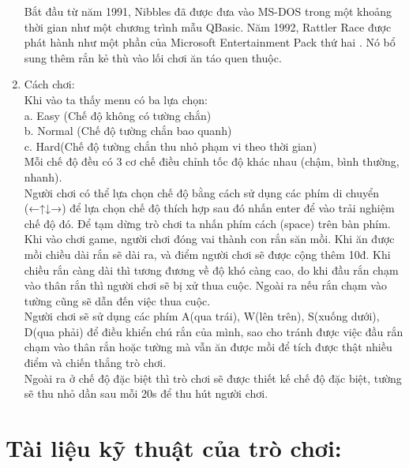 \documentclass{article}
\begin{document}
\begin{enumerate}
    Bắt đầu từ năm 1991, Nibbles đã được đưa vào MS-DOS trong một khoảng thời gian như một chương trình mẫu QBasic. Năm 1992, Rattler Race được phát hành như một phần của Microsoft Entertainment Pack thứ hai . Nó bổ sung thêm rắn kẻ thù vào lối chơi ăn táo quen thuộc.
    \item Cách chơi:\\
    Khi vào ta thấy menu có ba lựa chọn:\\
     a. Easy (Chế độ không có tường chắn)\\
     b. Normal (Chế độ tường chắn bao quanh)\\
     c. Hard(Chế độ tường chắn thu nhỏ phạm vi theo thời gian)\\
     Mỗi chế độ đều có 3 cơ chế điều chỉnh tốc độ khác nhau (chậm, bình thường, nhanh).\\
     Người chơi có thể lựa chọn chế độ bằng cách sử dụng các phím di chuyển (←↑↓→) để lựa chọn chế độ thích hợp sau đó nhấn enter để vào trải nghiệm chế độ đó. Để tạm dừng trò chơi ta nhấn phím cách (space) trên bàn phím.\\
     Khi vào chơi game, người chơi đóng vai thành con rắn săn mồi. Khi ăn được mồi chiều dài rắn sẽ dài ra, và điểm người chơi sẽ được cộng thêm 10đ. Khi chiều rắn càng dài thì tương đương về độ khó càng cao, do khi đầu rắn chạm vào thân rắn thì người chơi sẽ bị xử thua cuộc. Ngoài ra nếu rắn chạm vào tường cũng sẽ dẫn đến việc thua cuộc.\\
     Người chơi sẽ sử dụng các phím A(qua trái), W(lên trên), S(xuống dưới), D(qua phải) để điều khiển chú rắn của mình, sao cho tránh được việc đầu rắn chạm vào thân rắn hoặc tường mà vẫn ăn được mồi để tích được thật nhiều điểm và chiến thắng trò chơi.\\
     Ngoài ra ở chế độ đặc biệt thì trò chơi sẽ được thiết kế chế độ đặc biệt, tường sẽ thu nhỏ dần sau mỗi 20s để thu hút người chơi.\\
\end{enumerate}

\newpage
\section{Tài liệu kỹ thuật của trò chơi:}
\end{document}
